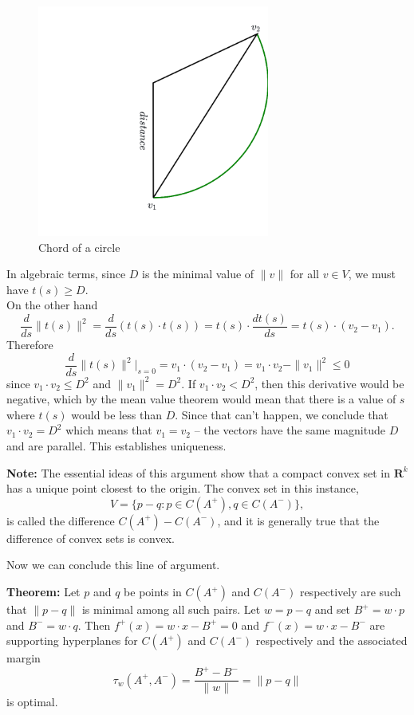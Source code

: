 \documentclass[
]{article}
\begin{document}
\begin{figure}
\hypertarget{fig:chord}{%
\centering
\includegraphics[width=3in,height=\textheight]{../img/chord2.png}
\caption{Chord of a circle}\label{fig:chord}
}
\end{figure}

In algebraic terms, since \(D\) is the minimal value of \(\|v\|\) for
all \(v\in V\), we must have \(t(s)\ge D\).\\
On the other hand \[
\frac{d}{ds}\|t(s)\|^2 = \frac{d}{ds}(t(s)\cdot t(s)) =t(s)\cdot \frac{dt(s)}{ds} = t(s)\cdot(v_2-v_1).
\] Therefore \[
\frac{d}{ds}\|t(s)\|^2|_{s=0} = v_{1}\cdot(v_{2}-v_{1})=v_{1}\cdot v_{2}-\|v_{1}\|^2\le 0
\] since \(v_{1}\cdot v_{2}\le D^{2}\) and \(\|v_{1}\|^2=D^2\). If
\(v_{1}\cdot v_{2}<D^{2}\), then this derivative would be negative,
which by the mean value theorem would mean that there is a value of
\(s\) where \(t(s)\) would be less than \(D\). Since that can't happen,
we conclude that \(v_{1}\cdot v_{2}=D^{2}\) which means that
\(v_{1}=v_{2}\) -- the vectors have the same magnitude \(D\) and are
parallel. This establishes uniqueness.

\textbf{Note:} The essential ideas of this argument show that a compact
convex set in \(\mathbf{R}^{k}\) has a unique point closest to the
origin. The convex set in this instance, \[
V=\{p-q:p\in C(A^{+}),q\in C(A^{-})\},
\] is called the difference \(C(A^{+})-C(A^{-})\), and it is generally
true that the difference of convex sets is convex.

Now we can conclude this line of argument.

\textbf{Theorem:} Let \(p\) and \(q\) be points in \(C(A^{+})\) and
\(C(A^{-})\) respectively are such that \(\|p-q\|\) is minimal among all
such pairs. Let \(w=p-q\) and set \(B^{+}=w\cdot p\) and
\(B^{-}=w\cdot q\). Then \(f^{+}(x)=w\cdot x-B^{+}=0\) and
\(f^{-}(x)=w\cdot x-B^{-}\) are supporting hyperplanes for \(C(A^{+})\)
and \(C(A^{-})\) respectively and the associated margin \[
\tau_{w}(A^{+},A^{-})=\frac{B^{+}-B^{-}}{\|w\|} = \|p-q\|
\] is optimal.
\end{document}
